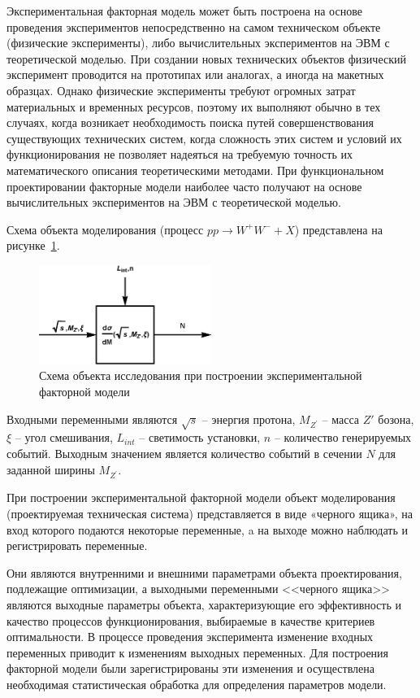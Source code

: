 Экспериментальная факторная модель может быть построена на основе
проведения экспериментов непосредственно на самом техническом объекте
(физические эксперименты), либо вычислительных экспериментов на ЭВМ с
теоретической моделью. При создании новых технических объектов физический
эксперимент проводится на прототипах или аналогах, а иногда на макетных
образцах. Однако физические эксперименты требуют огромных затрат
материальных и временных ресурсов, поэтому их выполняют обычно в тех
случаях, когда возникает необходимость поиска путей совершенствования
существующих технических систем, когда сложность этих систем и условий их
функционирования не позволяет надеяться на требуемую точность их
математического описания теоретическими методами. При функциональном
проектировании факторные модели наиболее часто получают на основе
вычислительных экспериментов на ЭВМ с теоретической моделью. 

Схема объекта
моделирования (процесс $pp \rightarrow W^+W^- + X$) представлена на рисунке~\ref{fig:schema-model}.

\begin{figure}[!h]
	\centering
	\includegraphics[width=0.5\textwidth]{figures/model.eps}
	\caption{Схема объекта исследования при построении экспериментальной
		факторной модели}
	\label{fig:schema-model}
\end{figure}

Входными переменными являются $\sqrt{s}$ -- энергия протона, ${M}_{{Z}^{\prime}}$ -- масса $Z'$ бозона, $\xi$ -- угол смешивания, ${L}_{int}$ -- светимость установки, $n$ -- количество генерируемых событий. Выходным значением является количество событий в сечении $N$ для заданной ширины ${M}_{{Z}^{\prime}}$.

При построении экспериментальной факторной модели объект
моделирования (проектируемая техническая система) представляется в виде
«черного ящика», на вход которого подаются некоторые переменные, a на
выходе можно наблюдать и регистрировать переменные. 

Они являются внутренними и внешними параметрами объекта проектирования,
подлежащие оптимизации, а выходными переменными <<черного ящика>>
являются выходные параметры объекта, характеризующие его эффективность и
качество процессов функционирования, выбираемые в качестве критериев
оптимальности. В процессе проведения эксперимента изменение входных
переменных приводит к изменениям выходных переменных. Для построения
факторной модели были зарегистрированы эти изменения и осуществлена
необходимая статистическая обработка для определения параметров модели.